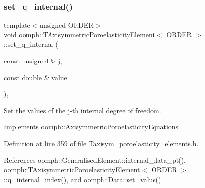 \mbox{\label{classoomph_1_1TAxisymmetricPoroelasticityElement_a7c5a9c57e9cbbe808b42ebe9aa727014}} 
\subsubsection{\texorpdfstring{set\+\_\+q\+\_\+internal()}{set\_q\_internal()}\hspace{0.1cm}{\footnotesize\ttfamily [1/2]}}
{\footnotesize\ttfamily template$<$unsigned O\+R\+D\+ER$>$ \\
void \hyperlink{classoomph_1_1TAxisymmetricPoroelasticityElement}{oomph\+::\+T\+Axisymmetric\+Poroelasticity\+Element}$<$ O\+R\+D\+ER $>$\+::set\+\_\+q\+\_\+internal (\begin{DoxyParamCaption}\item[{const unsigned \&}]{j,  }\item[{const double \&}]{value }\end{DoxyParamCaption})\hspace{0.3cm}{\ttfamily [inline]}, {\ttfamily [virtual]}}



Set the values of the j-\/th internal degree of freedom. 



Implements \hyperlink{classoomph_1_1AxisymmetricPoroelasticityEquations_a50d888d78b1115aa95226ddcb34d5969}{oomph\+::\+Axisymmetric\+Poroelasticity\+Equations}.



Definition at line 359 of file Taxisym\+\_\+poroelasticity\+\_\+elements.\+h.



References oomph\+::\+Generalised\+Element\+::internal\+\_\+data\+\_\+pt(), oomph\+::\+T\+Axisymmetric\+Poroelasticity\+Element$<$ O\+R\+D\+E\+R $>$\+::q\+\_\+internal\+\_\+index(), and oomph\+::\+Data\+::set\+\_\+value().

\mbox{\label{classoomph_1_1TAxisymmetricPoroelasticityElement_a00e8333ce5109b945075ebe1b355c742}} 

